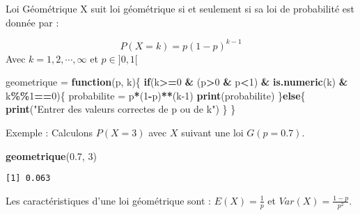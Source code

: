 \documentclass[
  ignorenonframetext,
]{beamer}
\newenvironment{Shaded}{\begin{snugshade}}{\end{snugshade}}
\newcommand{\ControlFlowTok}[1]{\textcolor[rgb]{0.13,0.29,0.53}{\textbf{#1}}}
\newcommand{\DecValTok}[1]{\textcolor[rgb]{0.00,0.00,0.81}{#1}}
\newcommand{\FloatTok}[1]{\textcolor[rgb]{0.00,0.00,0.81}{#1}}
\newcommand{\FunctionTok}[1]{\textcolor[rgb]{0.13,0.29,0.53}{\textbf{#1}}}
\newcommand{\NormalTok}[1]{#1}
\newcommand{\OtherTok}[1]{\textcolor[rgb]{0.56,0.35,0.01}{#1}}
\newcommand{\SpecialCharTok}[1]{\textcolor[rgb]{0.81,0.36,0.00}{\textbf{#1}}}
\newcommand{\StringTok}[1]{\textcolor[rgb]{0.31,0.60,0.02}{#1}}
\begin{document}
\begin{frame}[fragile]{Loi Géométrique}
\protect\hypertarget{loi-guxe9omuxe9trique}{}
X suit loi géométrique si et seulement si sa loi de probabilité est donnée par :

\[P(X=k) = p(1-p)^{k-1}\] Avec \(k=1, 2, \cdots, \infty\) et
\(p \in ]0 , 1[\)

\begin{Shaded}
\begin{Highlighting}[]
\NormalTok{geometrique }\OtherTok{=} \ControlFlowTok{function}\NormalTok{(p, k)\{}
  \ControlFlowTok{if}\NormalTok{(k}\SpecialCharTok{\textgreater{}=}\DecValTok{0} \SpecialCharTok{\&}\NormalTok{  (p}\SpecialCharTok{\textgreater{}}\DecValTok{0} \SpecialCharTok{\&}\NormalTok{ p}\SpecialCharTok{\textless{}}\DecValTok{1}\NormalTok{) }\SpecialCharTok{\&}  \FunctionTok{is.numeric}\NormalTok{(k) }\SpecialCharTok{\&}\NormalTok{ k}\SpecialCharTok{\%\%}\DecValTok{1}\SpecialCharTok{==}\DecValTok{0}\NormalTok{)\{}
\NormalTok{    probabilite }\OtherTok{=}\NormalTok{ p}\SpecialCharTok{*}\NormalTok{(}\DecValTok{1}\SpecialCharTok{{-}}\NormalTok{p)}\SpecialCharTok{**}\NormalTok{(k}\DecValTok{{-}1}\NormalTok{)}
    \FunctionTok{print}\NormalTok{(probabilite)}
\NormalTok{  \}}\ControlFlowTok{else}\NormalTok{\{}
    \FunctionTok{print}\NormalTok{(}\StringTok{"Entrer des valeurs correctes de p ou de k"}\NormalTok{)}
\NormalTok{  \}}
\NormalTok{\}}
\end{Highlighting}
\end{Shaded}
\end{frame}

\begin{frame}[fragile]{Exemple :}
\protect\hypertarget{exemple-3}{}
Calculons \(P(X=3)\) avec \(X\) suivant une loi \(G(p=0.7)\).

\begin{Shaded}
\begin{Highlighting}[]
\FunctionTok{geometrique}\NormalTok{(}\FloatTok{0.7}\NormalTok{, }\DecValTok{3}\NormalTok{)}
\end{Highlighting}
\end{Shaded}

\begin{verbatim}
[1] 0.063
\end{verbatim}

Les caractéristiques d'une loi géométrique sont : \(E(X)=\frac{1}{p}\)
et \(Var(X)=\frac{1-p}{p^2}\).
\end{frame}
\end{document}
